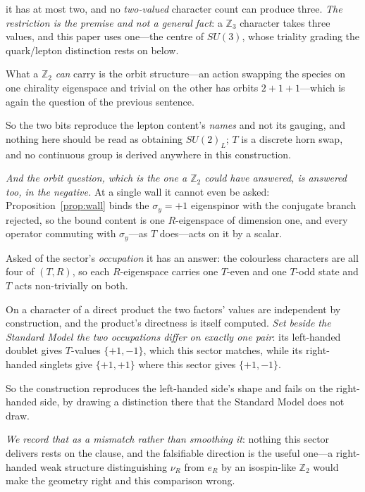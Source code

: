 \documentclass[11pt]{article}
\begin{document}
it has at most two, and no \emph{two-valued} character count can produce three. \emph{The restriction is the premise and not a general fact}: a $\mathbb{Z}_3$ character takes three values, and this paper uses one---the centre of $SU(3)$, whose triality grading the quark/lepton distinction rests on below. 

What a $\mathbb{Z}_2$ \emph{can} carry is the orbit structure---an action swapping the species on one chirality eigenspace and trivial on the other has orbits $2+1+1$---which is again the question of the previous sentence. 

So the two bits reproduce the lepton content's \emph{names} and not its gauging, and nothing here should be read as obtaining $SU(2)_L$; $T$ is a discrete horn swap, and no continuous group is derived anywhere in this construction. 

\emph{And the orbit question, which is the one a $\mathbb{Z}_2$ could have answered, is answered too, in the negative.} At a single wall it cannot even be asked: Proposition~\ref{prop:wall} binds the $\sigma_y=+1$ eigenspinor with the conjugate branch rejected, so the bound content is one $R$-eigenspace of dimension one, and every operator commuting with $\sigma_y$---as $T$ does---acts on it by a scalar. 

Asked of the sector's \emph{occupation} it has an answer: the colourless characters are all four of $(T,R)$, so each $R$-eigenspace carries one $T$-even and one $T$-odd state and $T$ acts non-trivially on both. 

On a character of a direct product the two factors' values are independent by construction, and the product's directness is itself computed. \emph{Set beside the Standard Model the two occupations differ on exactly one pair}: its left-handed doublet gives $T$-values $\{+1,-1\}$, which this sector matches, while its right-handed singlets give $\{+1,+1\}$ where this sector gives $\{+1,-1\}$. 

So the construction reproduces the left-handed side's shape and fails on the right-handed side, by drawing a distinction there that the Standard Model does not draw. 

\emph{We record that as a mismatch rather than smoothing it}: nothing this sector delivers rests on the clause, and the falsifiable direction is the useful one---a right-handed weak structure distinguishing $\nu_R$ from $e_R$ by an isospin-like $\mathbb{Z}_2$ would make the geometry right and this comparison wrong.
\end{document}
